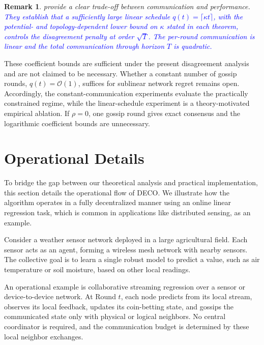 \documentclass[journal]{IEEEtran}
\newtheorem{remark}{Remark}
\newcommand{\algname}{{DECO}\xspace}
\begin{document}
\begin{remark}
     provide a clear trade-off between communication and performance.
    \textcolor{blue}{They establish that a sufficiently large linear schedule $q(t)=\lceil\kappa t\rceil$, with the potential- and topology-dependent lower bound on $\kappa$ stated in each theorem, controls the disagreement penalty at order $\sqrt{T}$. The per-round communication is linear and the total communication through horizon $T$ is quadratic.}
\end{remark}
{\color{blue}
    These coefficient bounds are sufficient under the present disagreement analysis and are not claimed to be necessary.
    Whether a constant number of gossip rounds, $q(t)=\mathcal{O}(1)$, suffices for sublinear network regret remains open.
    Accordingly, the constant-communication experiments evaluate the practically constrained regime, while the linear-schedule experiment is a theory-motivated empirical ablation.
    If $\rho=0$, one gossip round gives exact consensus and the logarithmic coefficient bounds are unnecessary.
    \par}

\section{Operational Details}\label{sec:operational-details}
To bridge the gap between our theoretical analysis and practical implementation, this section details the operational flow of \algname{}.
We illustrate how the algorithm operates in a fully decentralized manner using an online linear regression task, which is common in applications like distributed sensing, as an example.

Consider a weather sensor network deployed in a large agricultural field.
Each sensor acts as an agent, forming a wireless mesh network with nearby sensors.
The collective goal is to learn a single robust model to predict a value, such as air temperature or soil moisture, based on other local readings.
    {\color{blue}
        An operational example is collaborative streaming regression over a sensor or device-to-device network.
        At Round $t$, each node predicts from its local stream, observes its local feedback, updates its coin-betting state, and gossips the communicated state only with physical or logical neighbors.
        No central coordinator is required, and the communication budget is determined by these local neighbor exchanges.
        \par}
\end{document}

